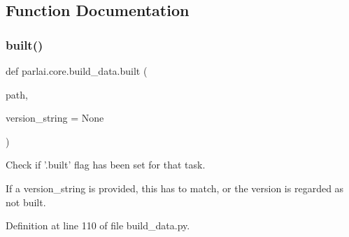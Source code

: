 \subsection{Function Documentation}
\mbox{\label{namespaceparlai_1_1core_1_1build__data_ad834e1a9be02e18a6c2de2b03b9a8f10}} 
\subsubsection{\texorpdfstring{built()}{built()}}
{\footnotesize\ttfamily def parlai.\+core.\+build\+\_\+data.\+built (\begin{DoxyParamCaption}\item[{}]{path,  }\item[{}]{version\+\_\+string = {\ttfamily None} }\end{DoxyParamCaption})}

\begin{DoxyVerb}Check if '.built' flag has been set for that task.

If a version_string is provided, this has to match, or the version is regarded as
not built.
\end{DoxyVerb}
 

Definition at line 110 of file build\+\_\+data.\+py.



